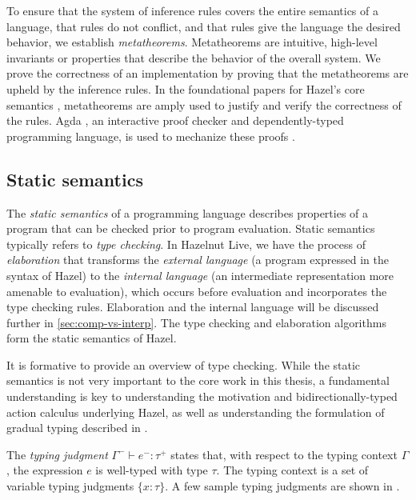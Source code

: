 To ensure that the system of inference rules covers the entire semantics of a language, that rules do not conflict, and that rules give the language the desired behavior, we establish \textit{metatheorems}. Metatheorems are intuitive, high-level invariants or properties that describe the behavior of the overall system. We prove the correctness of an implementation by proving that the metatheorems are upheld by the inference rules. In the foundational papers for Hazel's core semantics \cite{conf/popl/Hazelnut17,conf/popl/HazelnutLive19}, metatheorems are amply used to justify and verify the correctness of the rules. Agda \cite{bove2009brief}, an interactive proof checker and dependently-typed programming language, is used to mechanize these proofs \cite{agda2017_git,agda2019_git}.

\subsection{Static semantics}
\label{sec:static-semantics}

The \textit{static semantics} of a programming language describes properties of a program that can be checked prior to program evaluation. Static semantics typically refers to \textit{type checking}. In Hazelnut Live, we have the process of \textit{elaboration} that transforms the \textit{external language} (a program expressed in the syntax of Hazel) to the \textit{internal language} (an intermediate representation more amenable to evaluation), which occurs before evaluation and incorporates the type checking rules. Elaboration and the internal language will be discussed further in \cref{sec:comp-vs-interp}. The type checking and elaboration algorithms form the static semantics of Hazel.

It is formative to provide an overview of type checking. While the static semantics is not very important to the core work in this thesis, a fundamental understanding is key to understanding the motivation and bidirectionally-typed action calculus underlying Hazel, as well as understanding the formulation of gradual typing described in .

The \textit{typing judgment} $\Gamma^-\vdash e^-:\tau^+$ states that, with respect to the typing context $\Gamma$, the expression $e$ is well-typed with type $\tau$. The typing context is a set of variable typing judgments $\{x:\tau\}$. A few sample typing judgments are shown in .


